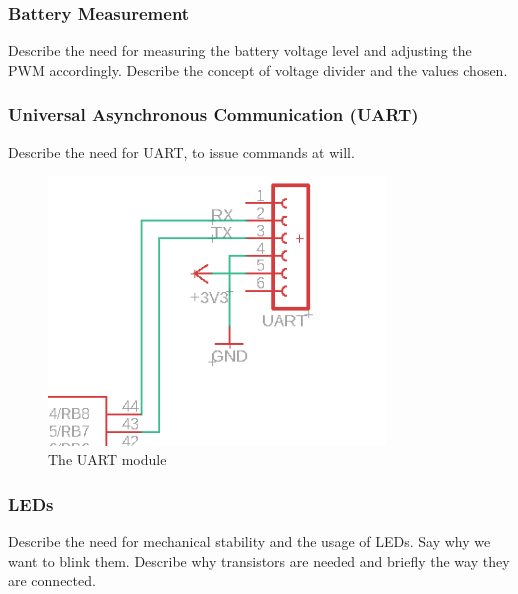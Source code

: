\FloatBarrier


\subsubsection{Battery Measurement}

Describe the need for measuring the battery voltage level
and adjusting the PWM accordingly. 
Describe the concept of voltage divider and the values chosen.


\subsubsection{Universal Asynchronous Communication (UART)}


Describe the need for UART, to issue commands at will.

\begin{figure}[htb]
    \centering
    \includegraphics[width=0.8\textwidth]{figures/hardware/UART.PNG}
    \caption{The UART module}
    \label{fig:uart}
\end{figure}

\FloatBarrier


\subsubsection{LEDs}

Describe the need for mechanical stability and the usage of LEDs. Say why we want to blink them.
Describe why transistors are needed and briefly the way they are connected.

